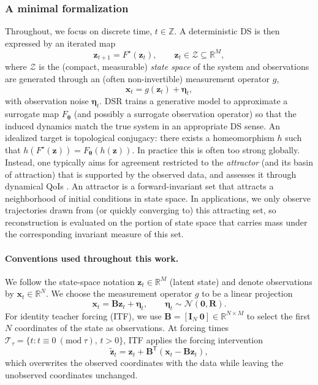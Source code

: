 \documentclass[twoside]{article}
\theoremstyle{plain}
\theoremstyle{definition}
\theoremstyle{remark}
\begin{document}
\subsubsection{A minimal formalization}
Throughout, we focus on discrete time, $t \in \mathbb{Z}$. A deterministic DS is then expressed by an iterated map
\begin{equation}
\label{eq:a0:ds_map}
\bm{z}_{t+1}=F^{\star}(\bm{z}_t),\qquad \bm{z}_t\in \mathcal{Z} \subseteq\mathbb{R}^M,
\end{equation}
where $\mathcal{Z}$ is the (compact, measurable) \emph{state space} of the system and observations are generated through an (often non-invertible) measurement operator $g$,
\begin{equation}
\label{eq:a0:obs}
\bm{x}_t = g(\bm{z}_t) + \bm{\eta}_t,
\end{equation}
with observation noise $\bm{\eta}_t$. DSR trains a generative model to approximate a surrogate map $F_{\bm\theta}$ (and possibly a surrogate observation operator) so that the induced dynamics match the true system in an appropriate DS sense.
An idealized target is topological conjugacy: there exists a homeomorphism $h$ such that $h(F^{\star}(\bm{z}))=F_{\bm\theta}(h(\bm{z}))$.
In practice this is often too strong globally. Instead, one typically aims for agreement restricted to the \emph{attractor} (and its basin of attraction) that is supported by the observed data, and assesses it through dynamical QoIs \citep{durstewitz2023reconstructing,goering2024oodg}. An attractor is a forward-invariant set that attracts a neighborhood of initial conditions in state space. In applications, we only observe trajectories drawn from (or quickly converging to) this attracting set, so reconstruction is evaluated on the portion of state space that carries mass under the corresponding invariant measure of this set. 
\paragraph{Conventions used throughout this work.}
We follow the state-space notation $\bm{z}_t\in\mathbb{R}^M$ (latent state) and denote observations by $\bm{x}_t\in\mathbb{R}^N$. We choose the measurement operator $g$ to be a linear projection
\begin{equation}
\label{eq:a0:obs_linear_B}
\bm{x}_t = \bm{B}\bm{z}_t + \bm{\eta}_t,\qquad \bm{\eta}_t\sim\mathcal N(\bm 0,\bm R).
\end{equation}
For identity teacher forcing (ITF), we use $\bm{B}=[\bm{I}_N\ \bm{0}] \in \mathbb{R}^{N\times M}$ to select the first $N$ coordinates of the state as observations. At forcing times $\mathcal T_\tau=\{t:t\equiv 0\ (\mathrm{mod}\ \tau),\,t>0\}$, ITF applies the forcing intervention
\begin{equation}
\label{eq:a0:itf_overwrite}
\tilde{\bm z}_t=\bm z_t+\bm B^{\mathsf T}(\bm x_t-\bm B\bm z_t),
\end{equation}
which overwrites the observed coordinates with the data while leaving the unobserved coordinates unchanged.
\end{document}
